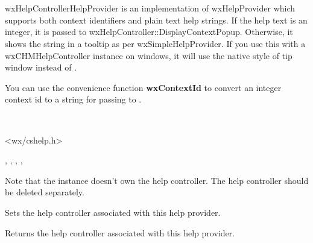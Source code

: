 \section{}\label{wxhelpcontrollerhelpprovider}

wxHelpControllerHelpProvider is an implementation of wxHelpProvider which supports
both context identifiers and plain text help strings. If the help text is an integer,
it is passed to wxHelpController::DisplayContextPopup. Otherwise, it shows the string
in a tooltip as per wxSimpleHelpProvider. If you use this with a wxCHMHelpController instance
on windows, it will use the native style of tip window instead of .

You can use the convenience function {\bf wxContextId} to convert an integer context
id to a string for passing to .


\\


<wx/cshelp.h>


, , 
, , 


\label{wxhelpcontrollerhelpproviderwxhelpcontrollerhelpprovider}


Note that the instance doesn't own the help controller. The help controller
should be deleted separately.

\label{wxhelpcontrollerhelpprovidersethelpcontroller}


Sets the help controller associated with this help provider.

\label{wxhelpcontrollerhelpprovidergethelpcontroller}


Returns the help controller associated with this help provider.

